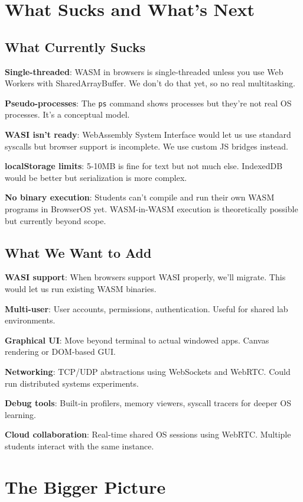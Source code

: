 \documentclass[conference]{IEEEtran}
\begin{document}
\section{What Sucks and What's Next}

\subsection{What Currently Sucks}

\textbf{Single-threaded}: WASM in browsers is single-threaded unless you use Web Workers with SharedArrayBuffer. We don't do that yet, so no real multitasking.

\textbf{Pseudo-processes}: The \texttt{ps} command shows processes but they're not real OS processes. It's a conceptual model.

\textbf{WASI isn't ready}: WebAssembly System Interface would let us use standard syscalls but browser support is incomplete. We use custom JS bridges instead.

\textbf{localStorage limits}: 5-10MB is fine for text but not much else. IndexedDB would be better but serialization is more complex.

\textbf{No binary execution}: Students can't compile and run their own WASM programs in BrowserOS yet. WASM-in-WASM execution is theoretically possible but currently beyond scope.

\subsection{What We Want to Add}

\textbf{WASI support}: When browsers support WASI properly, we'll migrate. This would let us run existing WASM binaries.

\textbf{Multi-user}: User accounts, permissions, authentication. Useful for shared lab environments.

\textbf{Graphical UI}: Move beyond terminal to actual windowed apps. Canvas rendering or DOM-based GUI.

\textbf{Networking}: TCP/UDP abstractions using WebSockets and WebRTC. Could run distributed systems experiments.

\textbf{Debug tools}: Built-in profilers, memory viewers, syscall tracers for deeper OS learning.

\textbf{Cloud collaboration}: Real-time shared OS sessions using WebRTC. Multiple students interact with the same instance.

\section{The Bigger Picture}
\end{document}
